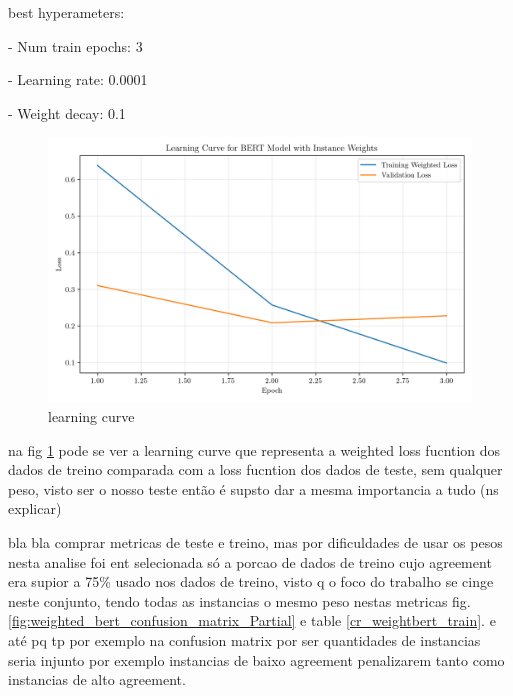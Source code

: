 \documentclass[conference]{IEEEtran}
\begin{document}
best hyperameters: 

- Num train epochs: 3

- Learning rate: 0.0001

- Weight decay: 0.1



\begin{figure}[H]
    \centering
    \includegraphics[width=1\linewidth]{assets/weighted_bert_learning_curve.png}
    \caption{learning curve}
    \label{fig:weighted_bert_learning_curve}
\end{figure}

na fig \ref{fig:weighted_bert_learning_curve} pode se ver a learning curve que representa a weighted loss fucntion dos dados de treino comparada com a loss fucntion dos dados de teste, sem qualquer peso, visto ser o nosso teste então é supsto dar a mesma importancia a tudo (ns explicar)

bla bla comprar metricas de teste e treino, mas por dificuldades de usar os pesos nesta analise foi ent selecionada só a porcao de dados de treino cujo agreement era supior a 75\% usado nos dados de treino, visto q o foco do trabalho se cinge neste conjunto, tendo todas as instancias o mesmo peso nestas metricas fig. \ref{fig:weighted_bert_confusion_matrix_Partial} e table \ref{cr_weightbert_train}. e até pq tp por exemplo na confusion matrix por ser quantidades de instancias seria injunto por exemplo instancias de baixo agreement penalizarem tanto como instancias de alto agreement.
\end{document}
